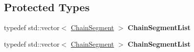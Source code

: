 \subsection*{Protected Types}
\begin{DoxyCompactItemize}
\item 
\mbox{\label{classPUBillboardChain_a868495232aba84d1b4aa0d493520d13f}} 
typedef std\+::vector$<$ \hyperlink{structPUBillboardChain_1_1ChainSegment}{Chain\+Segment} $>$ {\bfseries Chain\+Segment\+List}
\item 
\mbox{\label{classPUBillboardChain_a868495232aba84d1b4aa0d493520d13f}} 
typedef std\+::vector$<$ \hyperlink{structPUBillboardChain_1_1ChainSegment}{Chain\+Segment} $>$ {\bfseries Chain\+Segment\+List}
\end{DoxyCompactItemize}
